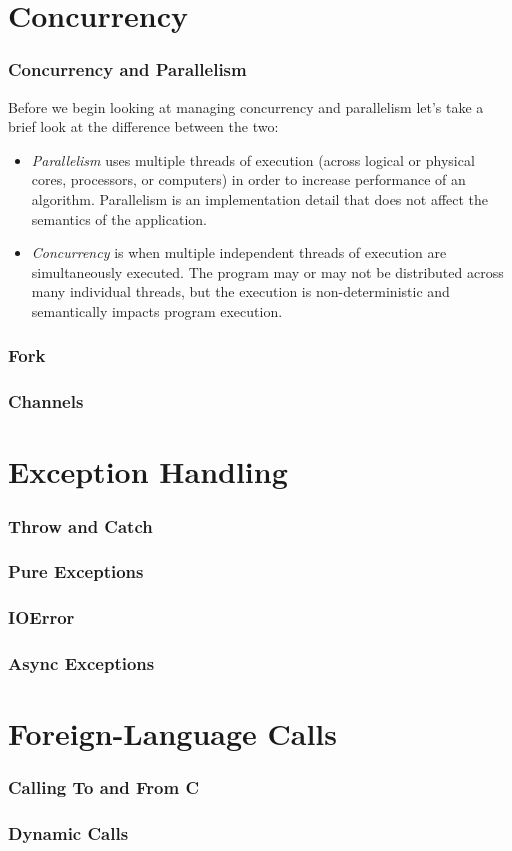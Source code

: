 \documentclass{beamer}
\begin{document}
\section{Concurrency}
\begin{frame}
  \frametitle{Concurrency and Parallelism}
  Before we begin looking at managing concurrency and parallelism
  let's take a brief look at the difference between the two:
  \begin{itemize}
  \item \emph{Parallelism} uses multiple threads of execution (across
    logical or physical cores, processors, or computers) in order to
    increase performance of an algorithm.  Parallelism is an
    implementation detail that does not affect the semantics of the
    application.
  \item \emph{Concurrency} is when multiple independent threads of
    execution are simultaneously executed.  The program may or may not
    be distributed across many individual threads, but the execution
    is non-deterministic and semantically impacts program execution.
  \end{itemize}
\end{frame}
\begin{frame}
  \frametitle{Fork}

\end{frame}
\begin{frame}
  \frametitle{Channels}

\end{frame}
\section{Exception Handling}
\begin{frame}
  \frametitle{Throw and Catch}

\end{frame}
\begin{frame}
  \frametitle{Pure Exceptions}

\end{frame}
\begin{frame}
  \frametitle{IOError}

\end{frame}
\begin{frame}
  \frametitle{Async Exceptions}

\end{frame}
\section{Foreign-Language Calls}
\begin{frame}
  \frametitle{Calling To and From C}

\end{frame}
\begin{frame}
  \frametitle{Dynamic Calls}

\end{frame}
\end{document}
